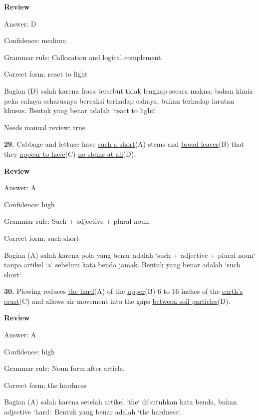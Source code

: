 \documentclass[12pt]{article}
\begin{document}
\par
\begingroup
\setlength{\parskip}{0pt}
\setlength{\parindent}{0pt}
\textbf{Review}\par
Answer: D\par
Confidence: medium\par
Grammar rule: Collocation and logical complement.\par
Correct form: react to light\par
Bagian (D) salah karena frasa tersebut tidak lengkap secara makna; bahan kimia peka cahaya seharusnya bereaksi terhadap cahaya, bukan terhadap larutan khusus. Bentuk yang benar adalah `react to light`.\par
Needs manual review: true\par
\endgroup
\par
\vspace{\questionblockgap}
\noindent\textbf{29.} Cabbage and lettuce have \uline{such a short}(A) stems and \uline{broad leaves}(B) that they \uline{appear to have}(C) \uline{no stems at all}(D).
\par
\begingroup
\setlength{\parskip}{0pt}
\setlength{\parindent}{0pt}
\textbf{Review}\par
Answer: A\par
Confidence: high\par
Grammar rule: Such + adjective + plural noun.\par
Correct form: such short\par
Bagian (A) salah karena pola yang benar adalah `such + adjective + plural noun` tanpa artikel `a` sebelum kata benda jamak. Bentuk yang benar adalah `such short`.\par
\endgroup
\par
\vspace{\questionblockgap}
\noindent\textbf{30.} Plowing reduces \uline{the hard}(A) of the \uline{upper}(B) 6 to 16 inches of the \uline{earth's crust}(C) and allows air movement into the gaps \uline{between soil particles}(D).
\par
\begingroup
\setlength{\parskip}{0pt}
\setlength{\parindent}{0pt}
\textbf{Review}\par
Answer: A\par
Confidence: high\par
Grammar rule: Noun form after article.\par
Correct form: the hardness\par
Bagian (A) salah karena setelah artikel `the` dibutuhkan kata benda, bukan adjective `hard`. Bentuk yang benar adalah `the hardness`.\par
\end{document}
